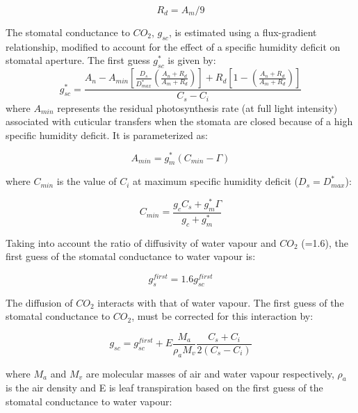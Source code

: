 {\begin{equation}
R_{d} = A_{m}/9
\end{equation}

The stomatal conductance to $CO_{2}$, $g_{sc}$, is estimated using a flux-gradient relationship, modified to
account for the effect of a specific humidity deficit on stomatal aperture. The first guess $g_{sc}^{*}$ is given
by:
%
\begin{equation}
g_{sc}^\ast = \frac{ A_{n}-A_{min}
\left[ 
\frac{D_{s}}{D_{max}^\ast} \left( \frac{A_{n}+R_{d}}{A_{m}+R_{d}}\right)
\right]
+R_{d} 
\left[  1- \left(\frac{A_{n}+R_{d}}{A_{m}+R_{d}}\right)    \right]      }{C_{s}-C_{i}}
\end{equation}
%
where $A_{min}$ represents the residual photosynthesis rate (at full light intensity) associated with cuticular
transfers when the stomata are closed because of a high specific humidity deficit. It is parameterized
as:

\begin{equation}
A_{min} = g_{m}^{*}(C_{min}-\Gamma)
\end{equation}

where $C_{min}$ is the value of $C_{i}$ at maximum specific humidity deficit ($D_{s} = D_{max}^{*}$):

\begin{equation}
C_{min} = \frac{g_{c}C_{s}+g_{m}^{*}\Gamma}{g_{c}+g_{m}^{*}}
\end{equation}

Taking into account the ratio of diffusivity of water vapour and $CO_{2}$ (=1.6), the first guess of the
stomatal conductance to water vapour is:

\begin{equation}\label{eq13}
g_{s}^{first} = 1.6g_{sc}^{first}
\end{equation}

The diffusion of $CO_{2}$ interacts with that of water vapour. The first guess of the stomatal conductance to
$CO_{2}$, must be corrected for this interaction by:

\begin{equation}\label{eq14}
g_{sc} = g_{sc}^{first}+E\frac{M_{a}}{\rho_{a}M_{v}} \frac{C_{s}+C_{i}}{2(C_{s}-C_{i})}
\end{equation}

where $M_{a}$ and $M_{v}$ are molecular masses of air and water vapour respectively, $\rho_{a}$ is the air density and
E is leaf transpiration based on the first guess of the stomatal conductance to water vapour:

}
